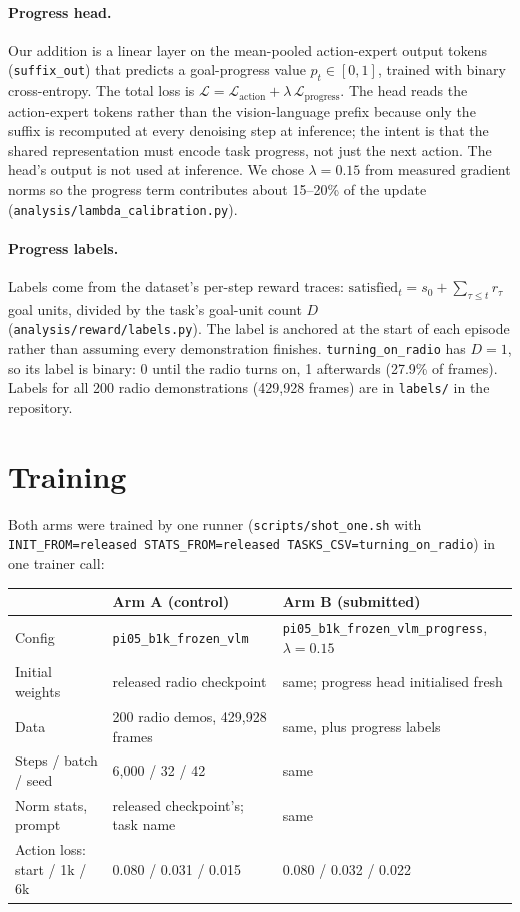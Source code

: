 \documentclass[10pt]{article}
\newcommand{\code}[1]{\texttt{#1}}
\begin{document}
\paragraph{Progress head.}
Our addition is a linear layer on the mean-pooled action-expert output tokens
(\code{suffix\_out}) that predicts a goal-progress value $p_t \in [0,1]$, trained with binary
cross-entropy. The total loss is $\mathcal{L} = \mathcal{L}_\text{action} + \lambda\,
\mathcal{L}_\text{progress}$. The head reads the action-expert tokens rather than the
vision-language prefix because only the suffix is recomputed at every denoising step at
inference; the intent is that the shared representation must encode task progress, not just
the next action. The head's output is not used at inference. We chose $\lambda = 0.15$ from
measured gradient norms so the progress term contributes about 15--20\% of the update
(\code{analysis/lambda\_calibration.py}).

\paragraph{Progress labels.}
Labels come from the dataset's per-step reward traces:
$\text{satisfied}_t = s_0 + \sum_{\tau \le t} r_\tau$ goal units, divided by the task's
goal-unit count $D$ (\code{analysis/reward/labels.py}). The label is anchored at the start of
each episode rather than assuming every demonstration finishes. \code{turning\_on\_radio} has
$D = 1$, so its label is binary: 0 until the radio turns on, 1 afterwards (27.9\% of frames).
Labels for all 200 radio demonstrations (429{,}928 frames) are in \code{labels/} in the
repository.

\section{Training}

Both arms were trained by one runner (\code{scripts/shot\_one.sh} with
\code{INIT\_FROM=released STATS\_FROM=released TASKS\_CSV=turning\_on\_radio}) in one trainer call:

\begin{center}
\small\begin{tabular}{lll}
\toprule
& Arm A (control) & Arm B (submitted) \\
\midrule
Config & \code{pi05\_b1k\_frozen\_vlm} & \code{pi05\_b1k\_frozen\_vlm\_progress}, $\lambda=0.15$ \\
Initial weights & released radio checkpoint & same; progress head initialised fresh \\
Data & 200 radio demos, 429{,}928 frames & same, plus progress labels \\
Steps / batch / seed & 6{,}000 / 32 / 42 & same \\
Norm stats, prompt & released checkpoint's; task name & same \\
Action loss: start / 1k / 6k & 0.080 / 0.031 / 0.015 & 0.080 / 0.032 / 0.022 \\
\bottomrule
\end{tabular}
\end{center}
\end{document}
